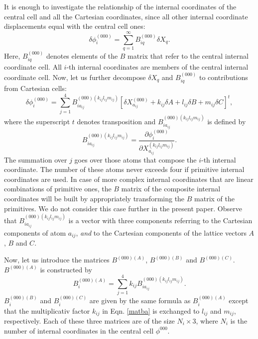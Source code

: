 \documentclass[prl,aps,preprint,superbib,12pt]{revtex4}
\begin{document}
It is enough to investigate the relationship of the internal 
coordinates of the central cell and all the Cartesian coordinates,
since all other internal coordinate displacements equal with the 
central cell ones:
\begin{equation} \label{intdispl1}
\delta \phi^{(000)}_{i} = \sum_{q=1}^{\infty} B^{(000)}_{iq} \delta X_{q} .
\end{equation}
Here, $B^{(000)}_{iq}$ denotes elements of the $B$ matrix that refer to
the central internal coordinate cell. All $i$-th internal coordinates
are members of the central internal coordinate cell.
Now, let us further decompose $\delta X_{q}$ and $B^{(000)}_{iq}$ 
to contributions from Cartesian cells:
\begin{equation} \label{latsum1}
\delta \phi^{(000)}_{i} = 
\sum_{j=1}^{4} 
B^{(000)(k_{ij}l_{ij}m_{ij})}_{ia_{ij}} [ \delta X^{(000)}_{a_{ij}} + k_{ij} \delta A + 
l_{ij} \delta B + m_{ij} \delta C ]^{t} ,
\end{equation}
where the superscript $t$ denotes transposition
and $B^{(000)(k_{ij}l_{ij}m_{ij})}_{ia_{ij}}$ is defined by
\begin{equation} 
B^{(000)(k_{ij}l_{ij}m_{ij})}_{ia_{ij}} = \frac{\partial 
\phi^{(000)}_{i}}{\partial X^{(k_{ij}l_{ij}m_{ij})}_{a_{ij}}} .
\end{equation} 
The summation over $j$ goes over those atoms that compose 
the $i$-th internal coordinate. The number of 
these atoms never exceeds four if primitive internal coordinates are used.
In case of more complex internal coordinates that are linear 
combinations of primitive ones, the $B$ matrix of the composite 
internal coordinates will be built
by appropriately transforming the $B$ matrix of the primitives. 
We do not consider this case further in the 
present paper.
Observe that $B^{(000)(k_{ij}l_{ij}m_{ij})}_{ia_{ij}}$ is a 
vector with three components referring to the Cartesian components
of atom $a_{ij}$, {\it and} to the Cartesian components of the
lattice vectors $A$, $B$ and $C$.

Now, let us introduce the matrices 
$B^{(000)(A)}$, $B^{(000)(B)}$ and $B^{(000)(C)}$.
$B^{(000)(A)}$ is constructed by
\begin{equation} \label{matba}
B^{(000)(A)}_{i} = \sum_{j=1}^{4} k_{ij} B^{(000)(k_{ij}l_{ij}m_{ij})}_{ia_{ij}} . 
\end{equation}
$B^{(000)(B)}_{i}$ and $B^{(000)(C)}_{i}$ are given by the same formula 
as $B^{(000)(A)}_{i}$ except that
the multiplicativ factor $k_{ij}$ in Eqn. \ref{matba} is exchanged to 
$l_{ij}$ and $m_{ij}$, respectively. Each of these three matrices
are of the size $N_{i} \times 3$, where $N_{i}$ is the number of
internal coordinates in the central cell $\phi^{000}$.
\end{document}
